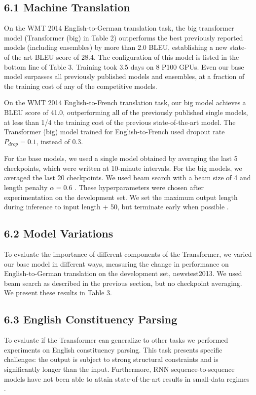 \documentclass[conference]{IEEEtran}
\begin{document}
\subsection{6.1 Machine Translation}

On the WMT 2014 English-to-German translation task, the big transformer model (Transformer (big) in Table 2) outperforms the best previously reported models (including ensembles) by more than 2.0 BLEU, establishing a new state-of-the-art BLEU score of 28.4. The configuration of this model is listed in the bottom line of Table 3. Training took 3.5 days on 8 P100 GPUs. Even our base model surpasses all previously published models and ensembles, at a fraction of the training cost of any of the competitive models.

On the WMT 2014 English-to-French translation task, our big model achieves a BLEU score of 41.0, outperforming all of the previously published single models, at less than 1/4 the training cost of the previous state-of-the-art model. The Transformer (big) model trained for English-to-French used dropout rate $P_{drop} = 0.1$, instead of 0.3.

For the base models, we used a single model obtained by averaging the last 5 checkpoints, which were written at 10-minute intervals. For the big models, we averaged the last 20 checkpoints. We used beam search with a beam size of 4 and length penalty $\alpha = 0.6$ \cite{ref38}. These hyperparameters were chosen after experimentation on the development set. We set the maximum output length during inference to input length + 50, but terminate early when possible \cite{ref38}.

\subsection{6.2 Model Variations}

To evaluate the importance of different components of the Transformer, we varied our base model in different ways, measuring the change in performance on English-to-German translation on the development set, newstest2013. We used beam search as described in the previous section, but no checkpoint averaging. We present these results in Table 3.

\subsection{6.3 English Constituency Parsing}

To evaluate if the Transformer can generalize to other tasks we performed experiments on English constituency parsing. This task presents specific challenges: the output is subject to strong structural constraints and is significantly longer than the input. Furthermore, RNN sequence-to-sequence models have not been able to attain state-of-the-art results in small-data regimes \cite{ref37}.
\end{document}
